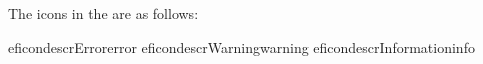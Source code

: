 
The icons in the \gdprobview are as follows:

\begin{gdreficon}
  \app{}eficondescr{Error}{error}
  \app{}eficondescr{Warning}{warning}
  \app{}eficondescr{Information}{info}
\end{gdreficon}
